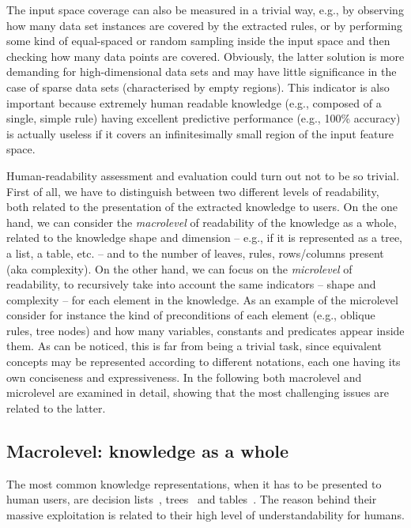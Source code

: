 \documentclass[sigconf]{acmart}
\begin{document}
The input space coverage can also be measured in a trivial way, e.g., by observing how many data set instances are covered by the extracted rules, or by performing some kind of equal-spaced or random sampling inside the input space and then checking how many data points are covered.
%
Obviously, the latter solution is more demanding for high-dimensional data sets and may have little significance in the case of sparse data sets (characterised by empty regions).
%
This indicator is also important because extremely human readable knowledge (e.g., composed of a single, simple rule) having excellent predictive performance (e.g., 100\% accuracy) is actually useless if it covers an infinitesimally small region of the input feature space.

Human-readability assessment and evaluation could turn out not to be so trivial.
%
First of all, we have to distinguish between two different levels of readability, both related to the presentation of the extracted knowledge to users.
%
On the one hand, we can consider the \emph{macrolevel} of readability of the knowledge as a whole, related to the knowledge shape and dimension -- e.g., if it is represented as a tree, a list, a table, etc. -- and to the number of leaves, rules, rows/columns present (aka complexity).
%
On the other hand, we can focus on the \emph{microlevel} of readability, to recursively take into account the same indicators -- shape and complexity -- for each element in the knowledge.
%
As an example of the microlevel consider for instance the kind of preconditions of each element (e.g., oblique rules, \mofn{} tree nodes) and how many variables, constants and predicates appear inside them.
%
As can be noticed, this is far from being a trivial task, since equivalent concepts may be represented according to different notations, each one having its own conciseness and expressiveness.
%
In the following both macrolevel and microlevel are examined in detail, showing that the most challenging issues are related to the latter.

\subsection{Macrolevel: knowledge as a whole}\label{ssec:macro}

The most common knowledge representations, when it has to be presented to human users, are decision lists~\cite{freitas2014comprehensible,huysmans2011empirical}, trees~\cite{quinlan1993c4,breiman1984classification} and tables~\cite{sethi2012kdruleex}.
%
The reason behind their massive exploitation is related to their high level of understandability for humans.
\end{document}
